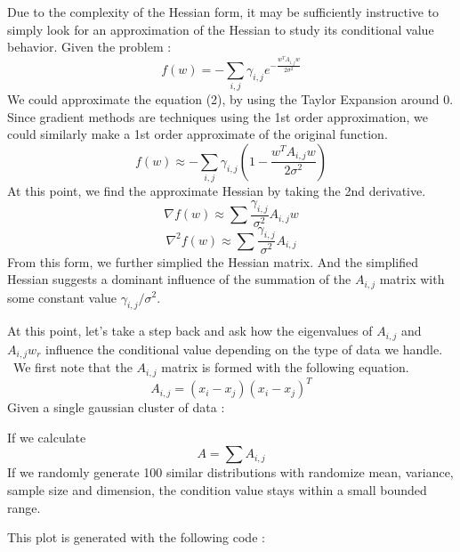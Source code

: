 \documentclass{article}
\begin{document}
Due to the complexity of the Hessian form, it may be sufficiently instructive
to simply look for an approximation of the Hessian to study its conditional
value behavior. Given the problem :
\begin{equation}
  f ( w) = - \sum_{i, j} \gamma_{i, j} e^{- \frac{w^T A_{i, j} w}{2 \sigma^2}}
\end{equation}
We could approximate the equation (2), by using the Taylor Expansion around 0.
Since gradient methods are techniques using the 1st order approximation, we
could similarly make a 1st order approximate of the original function.
\begin{equation}
  f ( w) \approx - \sum_{i, j} \gamma_{i, j}  \left( 1 - \frac{w^T A_{i, j}
  w}{2 \sigma^2} \right)
\end{equation}
At this point, we find the approximate Hessian by taking the 2nd derivative.
\[ \nabla f ( w) \approx \sum \frac{\gamma_{i, j}}{\sigma^2} A_{i, j} w \]
\[ \nabla^2 f ( w) \approx \sum \frac{\gamma_{i, j}}{\sigma^2} A_{i, j} \]
From this form, we further simplied the Hessian matrix. And the simplified
Hessian suggests a dominant influence of the summation of the $A_{i, j}$
matrix with some constant value $\gamma_{i, j} / \sigma^2$.



At this point, let's take a step back and ask how the eigenvalues of $A_{i,
j}$ and $A_{i, j} w_r$ influence the conditional value depending on the type
of data we handle. \ We first note that the $A_{i, j}$ matrix is formed with
the following equation.
\[ A_{i, j} = ( x_i - x_j) ( x_i - x_j)^T \]
Given a single gaussian cluster of data :

\begin{figure}[h]
  \caption{}
\end{figure}

If we calculate
\[ A = \sum A_{i, j} \]
If we randomly generate 100 similar distributions with randomize mean,
variance, sample size and dimension, the condition value stays within a small
bounded range.

\begin{figure}[h]
  \caption{}
\end{figure}

This plot is generated with the following code :
\end{document}
